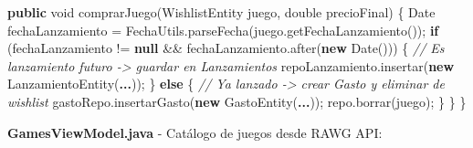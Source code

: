 \documentclass[
  spanish,
  11pt,
  paper=a4,
  ,captions=tableheading
]{scrartcl}
\newenvironment{Shaded}{}{}
\newcommand{\BuiltInTok}[1]{\textcolor[rgb]{0.00,0.50,0.00}{#1}}
\newcommand{\CommentTok}[1]{\textcolor[rgb]{0.38,0.63,0.69}{\textit{#1}}}
\newcommand{\ControlFlowTok}[1]{\textcolor[rgb]{0.00,0.44,0.13}{\textbf{#1}}}
\newcommand{\DataTypeTok}[1]{\textcolor[rgb]{0.56,0.13,0.00}{#1}}
\newcommand{\FunctionTok}[1]{\textcolor[rgb]{0.02,0.16,0.49}{#1}}
\newcommand{\KeywordTok}[1]{\textcolor[rgb]{0.00,0.44,0.13}{\textbf{#1}}}
\newcommand{\NormalTok}[1]{#1}
\newcommand{\OperatorTok}[1]{\textcolor[rgb]{0.40,0.40,0.40}{#1}}
\begin{document}
\begin{Shaded}
\begin{Highlighting}[]
    \KeywordTok{public} \DataTypeTok{void} \FunctionTok{comprarJuego}\OperatorTok{(}\NormalTok{WishlistEntity juego}\OperatorTok{,} \DataTypeTok{double}\NormalTok{ precioFinal}\OperatorTok{)} \OperatorTok{\{}
        \BuiltInTok{Date}\NormalTok{ fechaLanzamiento }\OperatorTok{=}\NormalTok{ FechaUtils}\OperatorTok{.}\FunctionTok{parseFecha}\OperatorTok{(}\NormalTok{juego}\OperatorTok{.}\FunctionTok{getFechaLanzamiento}\OperatorTok{());}
        \ControlFlowTok{if} \OperatorTok{(}\NormalTok{fechaLanzamiento }\OperatorTok{!=} \KeywordTok{null} \OperatorTok{\&\&}\NormalTok{ fechaLanzamiento}\OperatorTok{.}\FunctionTok{after}\OperatorTok{(}\KeywordTok{new} \BuiltInTok{Date}\OperatorTok{()))} \OperatorTok{\{}
            \CommentTok{// Es lanzamiento futuro {-}\textgreater{} guardar en Lanzamientos}
\NormalTok{            repoLanzamiento}\OperatorTok{.}\FunctionTok{insertar}\OperatorTok{(}\KeywordTok{new} \FunctionTok{LanzamientoEntity}\OperatorTok{(}\KeywordTok{...}\OperatorTok{));}
        \OperatorTok{\}} \ControlFlowTok{else} \OperatorTok{\{}
            \CommentTok{// Ya lanzado {-}\textgreater{} crear Gasto y eliminar de wishlist}
\NormalTok{            gastoRepo}\OperatorTok{.}\FunctionTok{insertarGasto}\OperatorTok{(}\KeywordTok{new} \FunctionTok{GastoEntity}\OperatorTok{(}\KeywordTok{...}\OperatorTok{));}
\NormalTok{            repo}\OperatorTok{.}\FunctionTok{borrar}\OperatorTok{(}\NormalTok{juego}\OperatorTok{);}
        \OperatorTok{\}}
    \OperatorTok{\}}
\OperatorTok{\}}
\end{Highlighting}
\end{Shaded}

\textbf{GamesViewModel.java} - Catálogo de juegos desde RAWG API:
\end{document}
